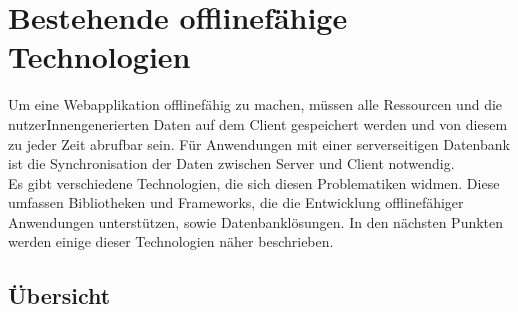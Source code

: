 %
%
\chapter{\label{chap:state}Bestehende offlinefähige Technologien}
Um eine Webapplikation offlinefähig zu machen, müssen alle Ressourcen und die nutzerInnengenerierten Daten auf dem Client gespeichert werden und von diesem zu jeder Zeit abrufbar sein.
Für Anwendungen mit einer serverseitigen Datenbank ist die Synchronisation der Daten zwischen Server und Client notwendig.\\
Es gibt verschiedene Technologien, die sich diesen Problematiken widmen.
Diese umfassen Bibliotheken und Frameworks, die die Entwicklung offlinefähiger Anwendungen unterstützen, sowie Datenbanklösungen. In den nächsten Punkten werden einige dieser Technologien näher beschrieben.
%
%

%
%

%
%

%
%

%
%

%
\section{Übersicht}
